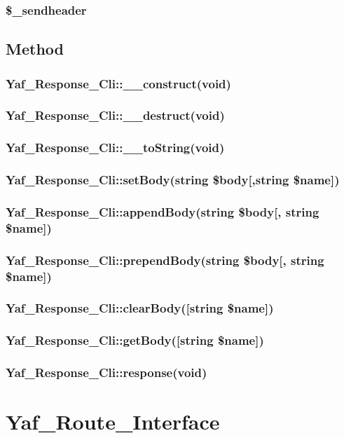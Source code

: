 \subsection{\$\_sendheader}


\section{Method}

\subsection{Yaf\_Response\_Cli::\_\_construct(void)}
\subsection{Yaf\_Response\_Cli::\_\_destruct(void)}
\subsection{Yaf\_Response\_Cli::\_\_toString(void)}
\subsection{Yaf\_Response\_Cli::setBody(string \$body[,string \$name])}
\subsection{Yaf\_Response\_Cli::appendBody(string \$body[, string \$name])}
\subsection{Yaf\_Response\_Cli::prependBody(string \$body[, string \$name])}
\subsection{Yaf\_Response\_Cli::clearBody([string \$name])}
\subsection{Yaf\_Response\_Cli::getBody([string \$name])}
\subsection{Yaf\_Response\_Cli::response(void)}




\chapter{Yaf\_Route\_Interface}

